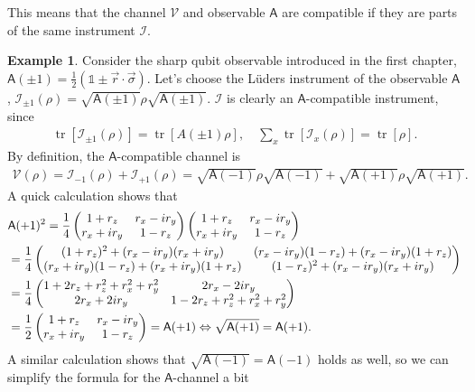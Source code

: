 \documentclass[a4paper,12pt]{wihuri}
\theoremstyle{definition}
\newtheorem{example}{Example}
\numberwithin{definition}{section}
\numberwithin{example}{section}
\numberwithin{theorem}{section}
\numberwithin{proposition}{section}
\numberwithin{lemma}{section}
\newcommand{\I}{\mathcal{I}}%
\newcommand{\V}{\mathcal{V}}%
\newcommand{\A}{\mathsf{A}}%
\newcommand{\id}{\mathds{1}}
\DeclareMathOperator{\tr}{tr}
\begin{document}
This means that the channel $\V$ and observable $\A$ are compatible if they are parts of the same instrument $\I$.
\begin{example}\label{sharp_qubit_luders}
Consider the sharp qubit observable introduced in the first chapter, $\A(\pm1) = \frac{1}{2}(\id \pm \vec{r}\cdot\vec{\sigma})$. Let's choose the Lüders instrument of the observable $\A$, $\I_{\pm1}(\rho) = \sqrt{\A(\pm1)}\rho\sqrt{\A(\pm1)}$. $\I$ is clearly an $\A$-compatible instrument, since
\begin{align*}
\tr[\I_{\pm1}(\rho)] = \tr[A(\pm1)\rho],\quad \sum_x\tr[\I_x(\rho)] = \tr[\rho]\text{.}
\end{align*}
By definition, the $\A$-compatible channel is 
\begin{align*}
\V(\rho) = \I_{-1}(\rho) + \I_{+1}(\rho) = \sqrt{\A(-1)} \rho \sqrt{\A(-1)} + \sqrt{\A(+1)} \rho \sqrt{\A(+1)}\text{.}
\end{align*}
A quick calculation shows that
\begin{align*}
&\A(+1)^2 = \dfrac{1}{4}
\begin{pmatrix}
1+r_z & r_x - ir_y \\
r_x + ir_y & 1-r_z
\end{pmatrix}
\begin{pmatrix}
1+r_z & r_x - ir_y \\
r_x + ir_y & 1-r_z
\end{pmatrix}\\
&= \dfrac{1}{4}
\begin{pmatrix}
(1+r_z)^2 + (r_x - ir_y)(r_x + ir_y) & (r_x-ir_y)(1-r_z) + (r_x-ir_y)(1+r_z)\\
(r_x+ir_y)(1-r_z) + (r_x+ir_y)(1+r_z) & (1-r_z)^2 + (r_x - ir_y)(r_x + ir_y)
\end{pmatrix}\\
&=\dfrac{1}{4}
\begin{pmatrix}
1+2r_z + r_z^2+r_x^2+r_y^2 & 2r_x-2ir_y \\
2r_x+2ir_y & 1-2r_z+r_z^2+r_x^2+r_y^2
\end{pmatrix}\\
&=\dfrac{1}{2}
\begin{pmatrix}
1+r_z & r_x-ir_y \\
r_x+ir_y & 1-r_z
\end{pmatrix} = \A(+1) \Leftrightarrow \sqrt{\A(+1)} = \A(+1)\text.
\end{align*}
A similar calculation shows that $\sqrt{\A(-1)} = \A(-1)$ holds as well, so we can simplify the formula for the $\A$-channel a bit

\end{example}
\end{document}
